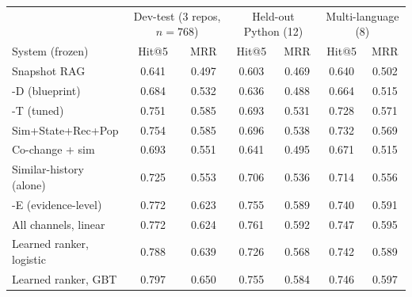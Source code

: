 \begin{tabular}{lcccccc}
\toprule
 & \multicolumn{2}{c}{Dev-test (3 repos, $n{=}768$)} & \multicolumn{2}{c}{Held-out Python (12)} & \multicolumn{2}{c}{Multi-language (8)} \\
System (frozen) & Hit@5 & MRR & Hit@5 & MRR & Hit@5 & MRR \\
\midrule
Snapshot RAG & 0.641 & 0.497 & 0.603 & 0.469 & 0.640 & 0.502 \\
\sys{}-D (blueprint) & 0.684 & 0.532 & 0.636 & 0.488 & 0.664 & 0.515 \\
\sys{}-T (tuned) & 0.751 & 0.585 & 0.693 & 0.531 & 0.728 & 0.571 \\
\midrule
Sim+State+Rec+Pop & 0.754 & 0.585 & 0.696 & 0.538 & 0.732 & 0.569 \\
Co-change + sim & 0.693 & 0.551 & 0.641 & 0.495 & 0.671 & 0.515 \\
\midrule
Similar-history (alone) & 0.725 & 0.553 & 0.706 & 0.536 & 0.714 & 0.556 \\
\sys{}-E (evidence-level) & 0.772 & 0.623 & 0.755 & 0.589 & 0.740 & 0.591 \\
All channels, linear & 0.772 & 0.624 & 0.761 & 0.592 & 0.747 & 0.595 \\
Learned ranker, logistic & 0.788 & 0.639 & 0.726 & 0.568 & 0.742 & 0.589 \\
Learned ranker, GBT & 0.797 & 0.650 & 0.755 & 0.584 & 0.746 & 0.597 \\
\bottomrule
\end{tabular}